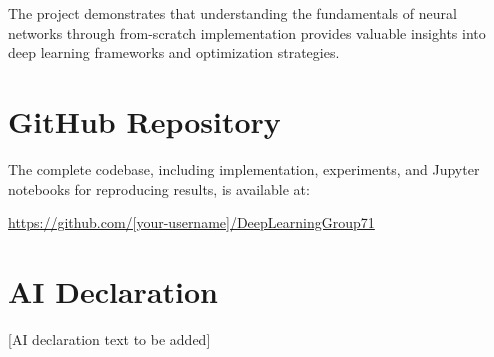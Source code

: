 \documentclass[11pt,a4paper]{article}
\begin{document}
The project demonstrates that understanding the fundamentals of neural networks through from-scratch implementation provides valuable insights into deep learning frameworks and optimization strategies.

\section*{GitHub Repository}

The complete codebase, including implementation, experiments, and Jupyter notebooks for reproducing results, is available at:

\url{https://github.com/[your-username]/DeepLearningGroup71}

\vspace{2cm}

\section*{AI Declaration}

[AI declaration text to be added]
\end{document}
